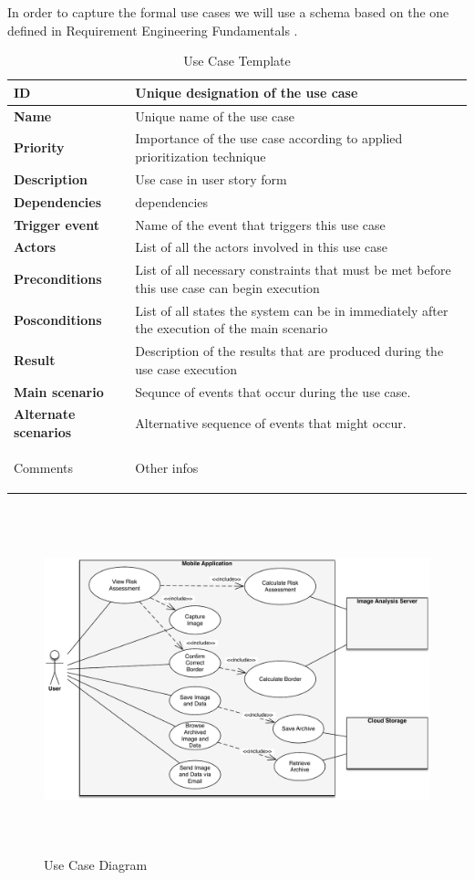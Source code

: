In order to capture the formal use cases we will use a schema based on the one defined in Requirement Engineering Fundamentals \cite{9781937538774}.


\begin{table}[H]
    \begin{tabular}{ | >{\bfseries}l | p{8.35cm} |}
    \hline
    ID &  Unique designation of the use case \\ \hline
    Name & Unique name of the use case \\ \hline
    Priority & Importance of the use case according to applied prioritization technique \\ \hline
    Description &  Use case in user story form\\ \hline
    Dependencies & dependencies \\ \hline
    Trigger event & Name of the event that triggers this use case \\ \hline
    Actors & List of all the actors involved in this use case \\ \hline
    Preconditions & List of all necessary constraints that must be met before this use case can begin execution \\ \hline
    Posconditions & List of all states the system can be in immediately after the execution of the main scenario  \\ \hline
    Result & Description of the results that are produced during the use case execution \\ \hline
    Main scenario & Sequnce of events that occur during the use case. \\ \hline
    Alternate scenarios & Alternative sequence of events that might occur. \\ \hline

    Comments & Other infos \\ \hline
    \end{tabular}

    \caption{Use Case Template}
    \label{fig:uc_template}
\end{table}








\begin{figure}[H]
    \centering
    \includegraphics[height=10cm,keepaspectratio]{assets/concept/UML.pdf}
    \caption{Use Case Diagram}
    \label{fig:uml}
\end{figure}